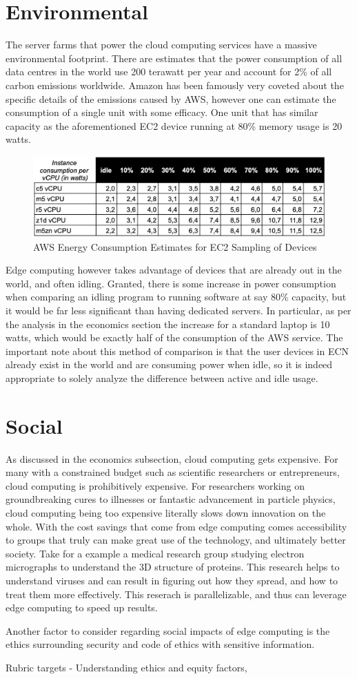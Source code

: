 \documentclass[../mthe-493-final-project.tex]{subfiles}
\begin{document}
    \section{Environmental}
    \label{sec:environmental}
    The server farms that power the cloud computing services have a massive environmental footprint. There are estimates that the power consumption of all data centres in the world use 200 terawatt per year and account for 2\% of all carbon emissions worldwide. Amazon has been famously very coveted about the specific details of the emissions caused by AWS, however one can estimate the consumption of a single unit with some efficacy. One unit that has similar capacity as the aforementioned EC2 device running at 80\% memory usage is 20 watts. 
    \begin{figure}
        \centering
        \includegraphics{thesis/img/ec2-energy-consumption.png}
        \caption{AWS Energy Consumption Estimates for EC2 Sampling of Devices}
        \label{fig:ec2-energy}
    \end{figure}
    Edge computing however takes advantage of devices that are already out in the world, and often idling. Granted, there is some increase in power consumption when comparing an idling program to running software at say 80\% capacity, but it would be far less significant than having dedicated servers. In particular, as per the analysis in the economics section the increase for a standard laptop is 10 watts, which would be exactly half of the consumption of the AWS service. The important note about this method of comparison is that the user devices in ECN already exist in the world and are consuming power when idle, so it is indeed appropriate to solely analyze the difference between active and idle usage. 

    
    \section{Social}
    \label{sec:social}
    As discussed in the economics subsection, cloud computing gets expensive. For many with a constrained budget such as scientific researchers or entrepreneurs, cloud computing is prohibitively expensive. For researchers working on groundbreaking cures to illnesses or fantastic advancement in particle physics, cloud computing being too expensive literally slows down innovation on the whole. With the cost savings that come from edge computing comes accessibility to groups that truly can make great use of the technology, and ultimately better society. Take for a example a medical research group studying electron micrographs to understand the 3D structure of proteins. This research helps to understand viruses and can result in figuring out how they spread, and how to treat them more effectively. This reserach is parallelizable, and thus can leverage edge computing to speed up results.
    
    Another factor to consider regarding social impacts of edge computing is the ethics surrounding security and code of ethics with sensitive information. 
    
    Rubric targets - Understanding ethics and equity factors, 
    
\end{document}
